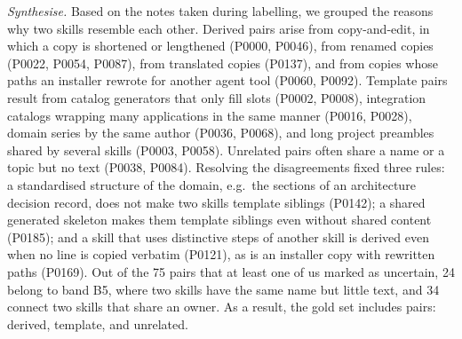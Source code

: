 \documentclass[sigconf,screen]{acmart}
\begin{document}
\emph{Synthesise.} Based on the notes taken during labelling, we grouped the reasons why two skills resemble each other. Derived pairs arise from copy-and-edit, in which a copy is shortened or lengthened (P0000, P0046), from renamed copies (P0022, P0054, P0087), from translated copies (P0137), and from copies whose paths an installer rewrote for another agent tool (P0060, P0092). Template pairs result from catalog generators that only fill slots (P0002, P0008), integration catalogs wrapping many applications in the same manner (P0016, P0028), domain series by the same author (P0036, P0068), and long project preambles shared by several skills (P0003, P0058). Unrelated pairs often share a name or a topic but no text (P0038, P0084). Resolving the disagreements fixed three rules: a standardised structure of the domain, e.g.\ the sections of an architecture decision record, does not make two skills template siblings (P0142); a shared generated skeleton makes them template siblings even without shared content (P0185); and a skill that uses distinctive steps of another skill is derived even when no line is copied verbatim (P0121), as is an installer copy with rewritten paths (P0169). Out of the 75 pairs that at least one of us marked as uncertain, 24 belong to band B5, where two skills have the same name but little text, and 34 connect two skills that share an owner. As a result, the gold set includes \ResGoldPairs{} pairs: \ResGoldDerived{} derived, \ResGoldTemplate{} template, and \ResGoldUnrelated{} unrelated.
\end{document}
